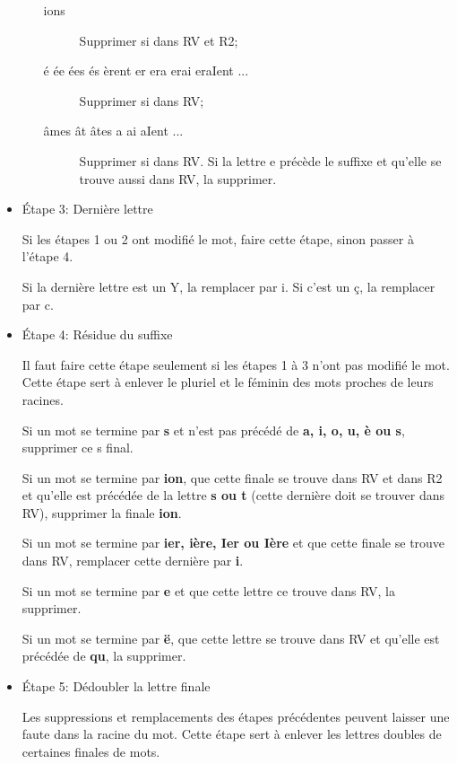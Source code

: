 \begin{itemize}
\begin{itemize}
\begin{description}
  \item[ions]
  
  Supprimer si dans RV et R2;
  
  \item[é ée ées és èrent er era erai eraIent ...]
  
  Supprimer si dans RV;
  
  \item[âmes ât âtes a ai aIent ...]
  
  Supprimer si dans RV. Si la lettre e précède le suffixe et qu'elle se trouve aussi dans RV, la supprimer.
\end{description}


\end{itemize}

\item{Étape 3: Dernière lettre}

Si les étapes 1 ou 2 ont modifié le mot, faire cette étape, sinon passer à l'étape 4.

Si la dernière lettre est un Y, la remplacer par i.
Si c'est un ç, la remplacer par c.

\item{Étape 4: Résidue du suffixe}

Il faut faire cette étape seulement si les étapes 1 à 3 n'ont pas modifié le mot.
Cette étape sert à enlever le pluriel et le féminin des mots proches de leurs racines.

Si un mot se termine par \textbf{s} et n'est pas précédé de \textbf{a, i, o, u, è ou s}, supprimer ce s final.

Si un mot se termine par \textbf{ion}, que cette finale se trouve dans RV et dans R2 et qu'elle est précédée de la lettre \textbf{s ou t} (cette dernière doit se trouver dans RV), supprimer la finale \textbf{ion}.

Si un mot se termine par \textbf{ier, ière, Ier ou Ière} et que cette finale se trouve dans RV, remplacer cette dernière par \textbf{i}.

Si un mot se termine par \textbf{e} et que cette lettre ce trouve dans RV, la supprimer.

Si un mot se termine par \textbf{ë}, que cette lettre se trouve dans RV et qu'elle est précédée de \textbf{qu}, la supprimer.

\item{Étape 5: Dédoubler la lettre finale}

Les suppressions et remplacements des étapes précédentes peuvent laisser une faute dans la racine du mot.
Cette étape sert à enlever les lettres doubles de certaines finales de mots.


\end{itemize}
